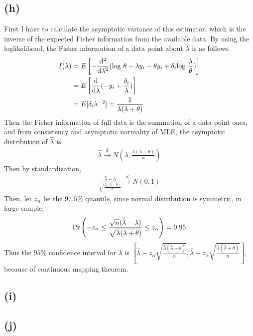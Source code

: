 \documentclass{article}
\begin{document}
\subsection{(h)}
First I have to calculate the asymptotic variance of this estimator, which is the inverse of the expected Fisher information from the available data. By using the loglikelihood, the Fisher information of a data point about $\lambda$ is as follows.
\begin{align*}
	I(\lambda) &= E\left[ -\frac{\mathrm{d}^2}{\mathrm{d}\lambda^2} ({\rm log}\ \theta - \lambda y_i - \theta y_i + \delta_i {\rm log}\ \frac{\lambda}{\theta}) \right]\\
	&= E\left[ \frac{\mathrm{d}}{\mathrm{d}\lambda} (-y_i + \frac{\delta_i}{\lambda}) \right]\\
	&= E[\delta_i \lambda^{-2}] = \frac{1}{\lambda(\lambda+\theta)}
\end{align*}
Then the Fisher information of full data is the summation of a data point ones, and from consistency and asymptotic normality of MLE, the asymptotic distribution of $\hat{\lambda}$ is
\begin{align*}
	\hat{\lambda} \stackrel{d}{\longrightarrow} N \left(\lambda, \frac{\lambda(\lambda+\theta)}{n} \right)
\end{align*}
Then by standardization,
\begin{align*}
	\frac{\hat{\lambda} - \lambda}{\sqrt{\frac{\lambda(\lambda+\theta)}{n}}} \stackrel{d}{\longrightarrow} N(0, 1)
\end{align*}
Then, let $z_{\alpha}$ be the $97.5\%$ quantile, since normal distribution is symmetric, in large sample,
\begin{align*}
	{\rm Pr}\left( -z_{\alpha} \leq \frac{\sqrt{n}(\hat{\lambda} - \lambda)}{\sqrt{\lambda(\lambda+\theta)}} \leq z_{\alpha}\right) = 0.95
\end{align*}
Thus the $95\%$ confidence interval for $\lambda$ is $\left[ \hat{\lambda} - z_{\alpha} \sqrt{\frac{\hat{\lambda} (\hat{\lambda}+\theta)}{n}}, \hat{\lambda} + z_{\alpha} \sqrt{\frac{\hat{\lambda} (\hat{\lambda}+\theta)}{n}}\right]$, because of continuous mapping theorem.

\subsection{(i)}
\subsection{(j)}
\end{document}
